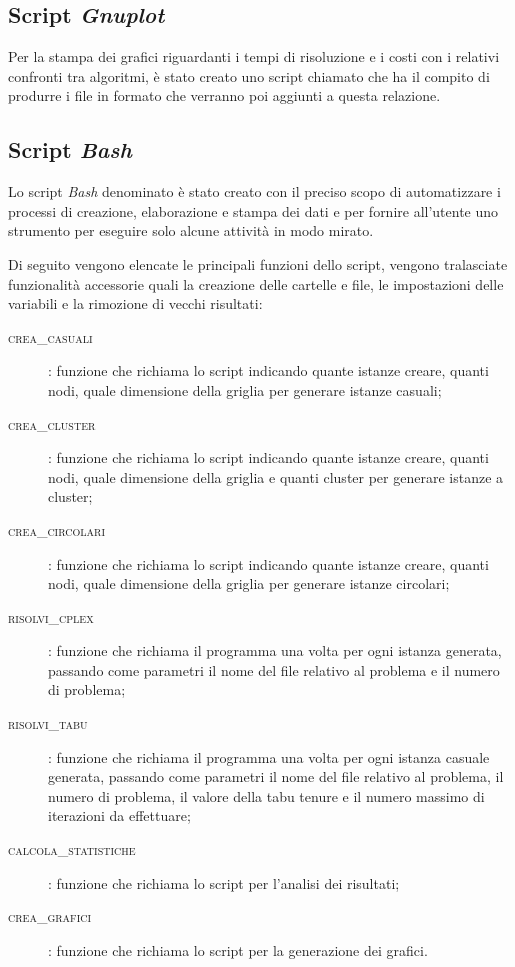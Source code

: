 \subsection{Script \emph{Gnuplot}}
Per la stampa dei grafici riguardanti i tempi di risoluzione e i costi con i relativi confronti tra algoritmi, è stato creato uno script chiamato  che ha il compito di produrre i file in formato  che verranno poi aggiunti a questa relazione.

\subsection{Script \emph{Bash}}
\label{sec:bash}
Lo script \emph{Bash} denominato  è stato creato con il preciso scopo di automatizzare i processi di creazione, elaborazione e stampa dei dati e per fornire all'utente uno strumento per eseguire solo alcune attività in modo mirato.

Di seguito vengono elencate le principali funzioni dello script, vengono tralasciate funzionalità accessorie quali la creazione delle cartelle e file, le impostazioni delle variabili e la rimozione di vecchi risultati:

\begin{description}
	\item[\textsc{crea\_casuali}]: funzione che richiama lo script  indicando quante istanze creare, quanti nodi, quale dimensione della griglia per generare istanze casuali;
	\item[\textsc{crea\_cluster}]: funzione che richiama lo script  indicando quante istanze creare, quanti nodi, quale dimensione della griglia e quanti cluster per generare istanze a cluster;
	\item[\textsc{crea\_circolari}]: funzione che richiama lo script  indicando quante istanze creare, quanti nodi, quale dimensione della griglia per generare istanze circolari;
	\item[\textsc{risolvi\_cplex}]: funzione che richiama il programma  una volta per ogni istanza generata, passando come parametri il nome del file relativo al problema e il numero di problema;
	\item[\textsc{risolvi\_tabu}]: funzione che richiama il programma  una volta per ogni istanza casuale generata, passando come parametri il nome del file relativo al problema, il numero di problema, il valore della tabu tenure e il numero massimo di iterazioni da effettuare;
	\item[\textsc{calcola\_statistiche}]: funzione che richiama lo script  per l'analisi dei risultati;
	\item[\textsc{crea\_grafici}]: funzione che richiama lo script  per la generazione dei grafici.
\end{description}